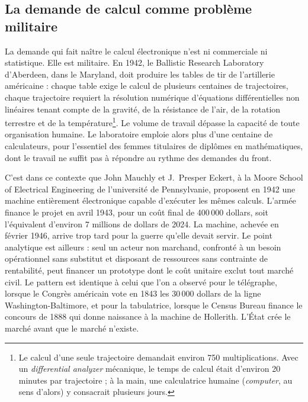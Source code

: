 \subsection{La demande de calcul comme problème militaire}\label{subsec:demand_pull_computing}

%

La demande qui fait naître le calcul électronique n'est ni commerciale ni statistique. Elle est militaire. En 1942, le Ballistic Research Laboratory d'Aberdeen, dans le Maryland, doit produire les tables de tir de l'artillerie américaine : chaque table exige le calcul de plusieurs centaines de trajectoires, chaque trajectoire requiert la résolution numérique d'équations différentielles non linéaires tenant compte de la gravité, de la résistance de l'air, de la rotation terrestre et de la température\footnote{Le calcul d'une seule trajectoire demandait environ 750 multiplications. Avec un \emph{differential analyzer} mécanique, le temps de calcul était d'environ 20 minutes par trajectoire ; à la main, une calculatrice humaine (\emph{computer}, au sens d'alors) y consacrait plusieurs jours.}. Le volume de travail dépasse la capacité de toute organisation humaine. Le laboratoire emploie alors plus d'une centaine de calculateurs, pour l'essentiel des femmes titulaires de diplômes en mathématiques, dont le travail ne suffit pas à répondre au rythme des demandes du front.

%
C'est dans ce contexte que John Mauchly et J.~Presper Eckert, à la Moore School of Electrical Engineering de l'université de Pennsylvanie, proposent en 1942 une machine entièrement électronique capable d'exécuter les mêmes calculs. L'armée finance le projet en avril 1943, pour un coût final de 400\,000 dollars, soit l'équivalent d'environ 7 millions de dollars de 2024. La machine, achevée en février 1946, arrive trop tard pour la guerre qu'elle devait servir. Le point analytique est ailleurs : seul un acteur non marchand, confronté à un besoin opérationnel sans substitut et disposant de ressources sans contrainte de rentabilité, peut financer un prototype dont le coût unitaire exclut tout marché civil. Le pattern est identique à celui que l'on a observé pour le télégraphe, lorsque le Congrès américain vote en 1843 les 30\,000 dollars de la ligne Washington-Baltimore, et pour la tabulatrice, lorsque le Census Bureau finance le concours de 1888 qui donne naissance à la machine de Hollerith. L'État crée le marché avant que le marché n'existe.

